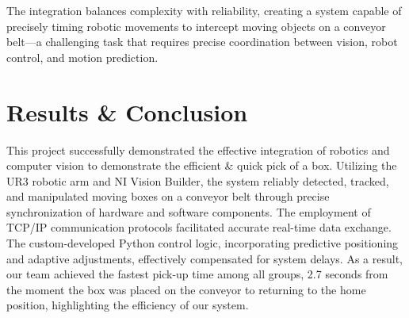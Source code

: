 \documentclass[a4paper, 10pt]{article}
\begin{document}
The integration balances complexity with reliability, creating a system capable of precisely timing robotic movements to intercept moving objects on a conveyor belt—a challenging task that requires precise coordination between vision, robot control, and motion prediction.

\newpage
\section{Results \& Conclusion}
This project successfully demonstrated the effective integration of robotics and computer vision to demonstrate the efficient \& quick pick of a box. Utilizing the UR3 robotic arm and NI Vision Builder, the system reliably detected, tracked, and manipulated moving boxes on a conveyor belt through precise synchronization of hardware and software components. The employment of TCP/IP communication protocols facilitated accurate real-time data exchange. The custom-developed Python control logic, incorporating predictive positioning and adaptive adjustments, effectively compensated for system delays. As a result, our team achieved the fastest pick-up time among all groups, 2.7 seconds from the moment the box was placed on the conveyor to returning to the home position, highlighting the efficiency of our system.

\newpage
{}


\end{document}

